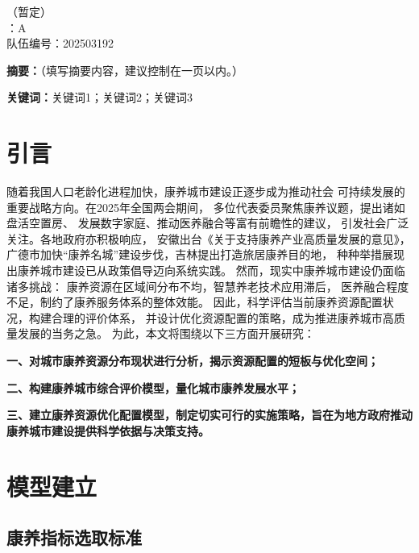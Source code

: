 \documentclass[12pt,a4paper]{article}
\begin{document}
\thispagestyle{empty}
\begin{center}
    （暂定） \\
    \vspace{1em}
    ：A \\
    \quad 队伍编号：202503192 \\
\end{center}

\vspace{2em}

\noindent\textbf{摘要：}（填写摘要内容，建议控制在一页以内。）

\vspace{1em}

\noindent\textbf{关键词：}关键词1；关键词2；关键词3

\newpage

\section{引言}

随着我国人口老龄化进程加快，康养城市建设正逐步成为推动社会
可持续发展的重要战略方向。在2025年全国两会期间，
多位代表委员聚焦康养议题，提出诸如盘活空置房、
发展数字家庭、推动医养融合等富有前瞻性的建议，
引发社会广泛关注。各地政府亦积极响应，
安徽出台《关于支持康养产业高质量发展的意见》\cite{01}，
广德市加快“康养名城”建设步伐，吉林提出打造旅居康养目的地，
种种举措展现出康养城市建设已从政策倡导迈向系统实践。
然而，现实中康养城市建设仍面临诸多挑战：
康养资源在区域间分布不均，智慧养老技术应用滞后，
医养融合程度不足，制约了康养服务体系的整体效能。
因此，科学评估当前康养资源配置状况，构建合理的评价体系，
并设计优化资源配置的策略，成为推进康养城市高质量发展的当务之急。
为此，本文将围绕以下三方面开展研究：

\textbf{一、对城市康养资源分布现状进行分析，揭示资源配置的短板与优化空间；}

\textbf{二、构建康养城市综合评价模型，量化城市康养发展水平；}

\textbf{三、建立康养资源优化配置模型，制定切实可行的实施策略，旨在为地方政府推动康养城市建设提供科学依据与决策支持。}

\twocolumn

\section{模型建立}

\subsection{康养指标选取标准}
\end{document}
